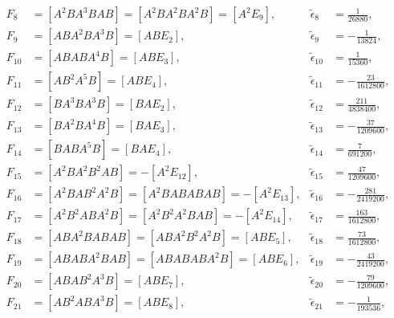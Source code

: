 \documentclass[12pt]{article}
\begin{document}
\begin{equation}
  \begin{aligned}
    \nonumber
    F_{8} &= \left [ A^{2} B A^{3} B A B \right ] = \left [ A^{2} B A^{2} B A^{2} B \right ] = \left [ A^{2} E_{9} \right ], & \tilde{\epsilon}_{8} &= \frac{1}{26 880}, \\
    F_{9} &= \left [ A B A^{2} B A^{3} B \right ] = \left [ A B E_{2} \right ], & \tilde{\epsilon}_{9} &= - \frac{1}{13 824}, \\
    F_{10} &= \left [ A B A B A^{4} B \right ] = \left [ A B E_{3} \right ], & \tilde{\epsilon}_{10} &= \frac{1}{15 360}, \\
    F_{11} &= \left [ A B^{2} A^{5} B \right ] = \left [ A B E_{4} \right ], & \tilde{\epsilon}_{11} &= - \frac{23}{1 612 800}, \\
    F_{12} &= \left [ B A^{3} B A^{3} B \right ] = \left [ B A E_{2} \right ], & \tilde{\epsilon}_{12} &= \frac{211}{4 838 400}, \\
    F_{13} &= \left [ B A^{2} B A^{4} B \right ] = \left [ B A E_{3} \right ], & \tilde{\epsilon}_{13} &= - \frac{37}{1 209 600}, \\
    F_{14} &= \left [ B A B A^{5} B \right ] = \left [ B A E_{4} \right ], & \tilde{\epsilon}_{14} &= \frac{7}{691 200}, \\
    F_{15} &= \left [ A^{2} B A^{2} B^{2} A B \right ] = - \left [ A^{2} E_{12} \right ], & \tilde{\epsilon}_{15} &= \frac{47}{1 209 600}, \\
    F_{16} &= \left [ A^{2} B A B^{2} A^{2} B \right ] = \left [ A^{2} B A B A B A B \right ] = - \left [ A^{2} E_{13} \right ], & \tilde{\epsilon}_{16} &= - \frac{281}{2 419 200}, \\
    F_{17} &= \left [ A^{2} B^{2} A B A^{2} B \right ] = \left [ A^{2} B^{2} A^{2} B A B \right ] = - \left [ A^{2} E_{14} \right ], & \tilde{\epsilon}_{17} &= \frac{163}{1 612 800}, \\
    F_{18} &= \left [ A B A^{2} B A B A B \right ] = \left [ A B A^{2} B^{2} A^{2} B \right ] = \left [ A B E_{5} \right ], & \tilde{\epsilon}_{18} &= \frac{73}{1 612 800}, \\
    F_{19} &= \left [ A B A B A^{2} B A B \right ] = \left [ A B A B A B A^{2} B \right ] = \left [ A B E_{6} \right ], & \tilde{\epsilon}_{19} &= - \frac{43}{2 419 200}, \\
    F_{20} &= \left [ A B A B^{2} A^{3} B \right ] = \left [ A B E_{7} \right ], & \tilde{\epsilon}_{20} &= - \frac{79}{1 209 600}, \\
    F_{21} &= \left [ A B^{2} A B A^{3} B \right ] = \left [ A B E_{8} \right ], & \tilde{\epsilon}_{21} &= - \frac{1}{193 536}, \\

\end{aligned}
\end{equation}
\end{document}
